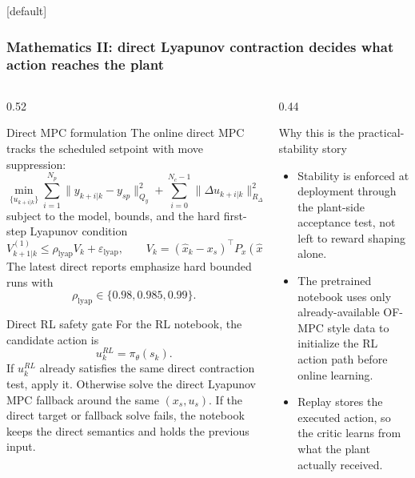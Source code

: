 \documentclass[aspectratio=169]{beamer}
\begin{document}
\begin{frame}
[default]
\frametitle{\large \textbf{Mathematics II: direct Lyapunov contraction decides what action reaches the plant}}
\scriptsize
\vspace{-0.30cm}

\begin{columns}[T,onlytextwidth]

\begin{column}{0.52\textwidth}
\begin{block}{Direct MPC formulation}
\justifying
The online direct MPC tracks the scheduled setpoint with move suppression:
\[
\min_{\{u_{k+i|k}\}}
\sum_{i=1}^{N_p}\|y_{k+i|k}-y_{sp}\|_{Q_y}^2
+
\sum_{i=0}^{N_c-1}\|\Delta u_{k+i|k}\|_{R_{\Delta u}}^2
\]
subject to the model, bounds, and the hard first-step Lyapunov condition
\[
V_{k+1|k}^{(1)} \le \rho_{\mathrm{lyap}}V_k+\varepsilon_{\mathrm{lyap}},
\qquad
V_k=(\hat x_k-x_s)^\top P_x(\hat x_k-x_s).
\]
The latest direct reports emphasize hard bounded runs with
\[
\rho_{\mathrm{lyap}}\in\{0.98,0.985,0.99\}.
\]
\end{block}

\vspace{0.02cm}

\begin{block}{Direct RL safety gate}
\justifying
For the RL notebook, the candidate action is
\[
u_k^{RL}=\pi_\theta(s_k).
\]
If \(u_k^{RL}\) already satisfies the same direct contraction test, apply it. Otherwise solve the direct Lyapunov MPC fallback around the same \((x_s,u_s)\). If the direct target or fallback solve fails, the notebook keeps the direct semantics and holds the previous input.
\end{block}
\end{column}

\begin{column}{0.44\textwidth}
\begin{block}{Why this is the practical-stability story}
\begin{itemize}\justifying
  \setlength{\itemsep}{0.28ex}
  \item Stability is enforced at deployment through the plant-side acceptance test, not left to reward shaping alone.
  \item The pretrained notebook uses only already-available OF-MPC style data to initialize the RL action path before online learning.
  \item Replay stores the executed action, so the critic learns from what the plant actually received.
\end{itemize}
\end{block}


\end{column}
\end{columns}
\end{frame}
\end{document}

